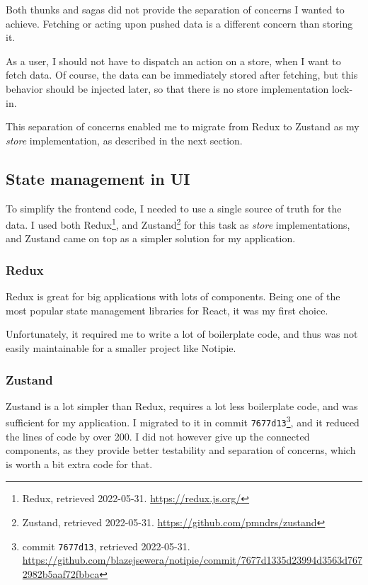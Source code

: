 Both thunks and sagas did not provide the separation of concerns I
wanted to achieve. Fetching or acting upon pushed data is a different
concern than storing it.

As a user, I should not have to dispatch an action on a store, when I
want to fetch data. Of course, the data can be immediately stored after
fetching, but this behavior should be injected later, so that there is
no store implementation lock-in.

This separation of concerns enabled me to migrate from Redux to Zustand
as my \emph{store} implementation, as described in the next section.

\hypertarget{state-management-in-ui}{%
\subsection{State management in UI}\label{state-management-in-ui}}

To simplify the frontend code, I needed to use a single source of truth
for the data. I used both Redux\footnote{Redux, retrieved 2022-05-31.
  \url{https://redux.js.org/}}, and Zustand\footnote{Zustand, retrieved
  2022-05-31. \url{https://github.com/pmndrs/zustand}} for this task as
\emph{store} implementations, and Zustand came on top as a simpler
solution for my application.

\hypertarget{redux}{%
\subsubsection{Redux}\label{redux}}

Redux is great for big applications with lots of components. Being one
of the most popular state management libraries for React, it was my
first choice.

Unfortunately, it required me to write a lot of boilerplate code, and
thus was not easily maintainable for a smaller project like Notipie.

\hypertarget{zustand}{%
\subsubsection{Zustand}\label{zustand}}

Zustand is a lot simpler than Redux, requires a lot less boilerplate
code, and was sufficient for my application. I migrated to it in commit
\texttt{7677d13}\footnote{commit \texttt{7677d13}, retrieved 2022-05-31.
  \url{https://github.com/blazejsewera/notipie/commit/7677d1335d23994d3563d7672982b5aaf72fbbca}},
and it reduced the lines of code by over 200. I did not however give up
the connected components, as they provide better testability and
separation of concerns, which is worth a bit extra code for that.

